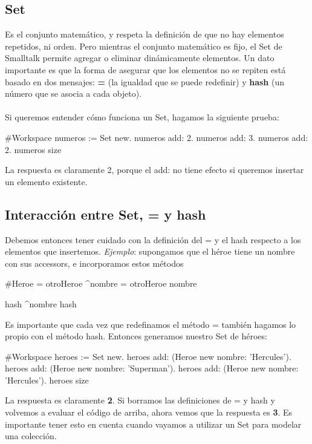 \documentclass[a4paper,12pt]{book}
\begin{document}
\subsection{Set}

Es el conjunto matemático, y respeta la definición de que no hay elementos repetidos, ni orden. Pero mientras
el conjunto matemático es fijo, el Set de Smalltalk permite agregar o eliminar dinámicamente elementos. 
Un dato importante es que la forma de asegurar que los elementos no se repiten está basado en dos mensajes:
\textbf{=} (la igualdad que se puede redefinir) y \textbf{hash} (un número que se asocia a cada objeto).
\\
\\
Si queremos entender cómo funciona un Set, hagamos la siguiente prueba:

\begin{code}
#Workspace
numeros := Set new.
numeros add: 2.
numeros add: 3.
numeros add: 2.
numeros size
\end{code}

La respuesta es claramente 2, porque el add: no tiene efecto si queremos insertar un elemento existente.

\subsection{Interacción entre Set, = y hash}
Debemos entonces tener cuidado con la definición del = y el hash respecto a los elementos que insertemos.
\textit{Ejemplo}: supongamos que el héroe tiene un nombre con sus accessors, e incorporamos estos métodos

\begin{code}
#Heroe
= otroHeroe
    ^nombre = otroHeroe nombre
    
hash
    ^nombre hash
\end{code}

Es importante que cada vez que redefinamos el método = también hagamos lo propio con el método hash.
Entonces generamos nuestro Set de héroes:

\begin{code}
#Workspace
heroes := Set new.
heroes add: (Heroe new nombre: 'Hercules').
heroes add: (Heroe new nombre: 'Superman').
heroes add: (Heroe new nombre: 'Hercules').
heroes size
\end{code}

La respuesta es claramente \textbf{2}. Si borramos las definiciones de = y hash y volvemos a evaluar 
el código de arriba, ahora vemos que la respuesta es \textbf{3}. Es importante tener esto en cuenta cuando
vayamos a utilizar un Set para modelar una colección.
\end{document}
